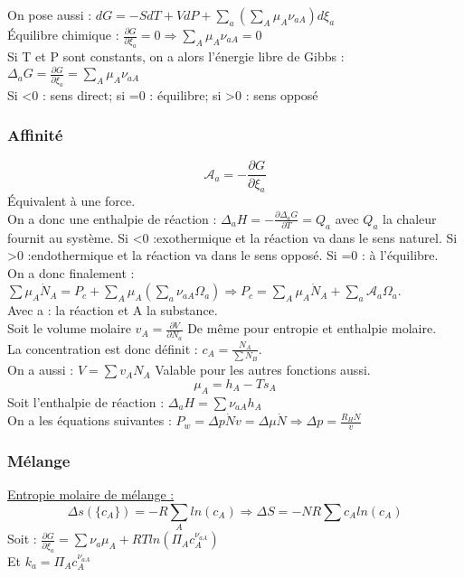 \documentclass[../main.tex]{subfiles}
\begin{document}
On pose aussi : $dG = -SdT + VdP + \sum_a (\sum_A \mu_A \nu_{aA})d\xi_a$\\
Équilibre chimique : $\frac{\partial G}{\partial \xi_a} = 0 \Rightarrow \sum_A \mu_A \nu_{aA}=0$\\
Si T et P sont constants, on a alors l'énergie libre de Gibbs : $\Delta_a G = \frac{\partial G}{\partial \xi_a} = \sum_A \mu_A \nu_{aA}$\\
Si <0 : sens direct; si =0 : équilibre; si >0 : sens opposé\\

\subsubsection{Affinité}
\begin{equation}
    \mathcal{A}_a = -\frac{\partial G}{\partial \xi_a}
\end{equation}
Équivalent à une force. \\
On a donc une enthalpie de réaction : $\Delta_a H = -\frac{\partial \Delta_a G}{\partial T} = Q_a$ avec $Q_a$ la chaleur fournit au système. Si <0 :exothermique et la réaction va dans le sens naturel. Si >0 :endothermique et la réaction va dans le sens opposé. Si =0 : à l'équilibre.\\
On a donc finalement : $\sum \mu_A \dot{N}_A = P_c + \sum_A \mu_A(\sum_a \nu_{aA} \Omega_a) \Rightarrow P_c = \sum_A \mu_A \dot{N}_A + \sum_a \mathcal{A}_a \Omega_a$.\\
Avec a : la réaction et A la substance.\\

Soit le volume molaire $v_A = \frac{\partial V}{\partial N_a}$ De même pour entropie et enthalpie molaire.\\
La concentration est donc définit : $c_A = \frac{N_A}{\sum N_B}$.\\
On a aussi : $V= \sum v_A N_A$ Valable pour les autres fonctions aussi.\\

\begin{equation}
    \mu_A = h_A-Ts_A
\end{equation}
Soit l'enthalpie de réaction : $\Delta_a H = \sum \nu_{aA} h_A$\\
On a les équations suivantes : $P_w = \Delta p \dot{N} v = \Delta \mu \dot{N} \Rightarrow \Delta p = \frac{R_H \dot{N}}{v}$\\

\subsubsection{Mélange}
\quad \underline{Entropie molaire de mélange :}\\
\begin{equation}
    \Delta s(\{c_A\}) = -R \sum_A ln(c_A) \Rightarrow \Delta S = -NR \sum c_A ln(c_A)
\end{equation}
Soit : $\frac{\partial G}{\partial \xi_a} = \sum \nu_a \mu_A + RTln(\Pi_A c_A^{\nu_{aA}})$\\
Et $k_a = \Pi_A c_A^{\nu_{aA}}$\\
\end{document}
